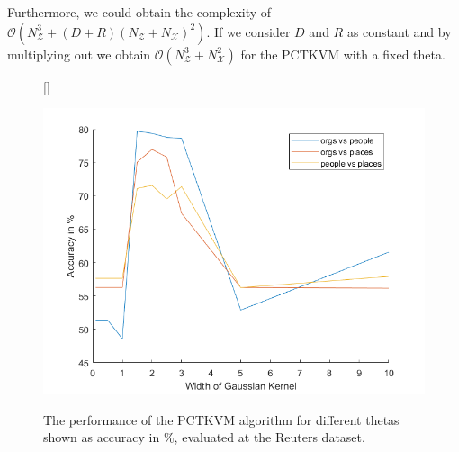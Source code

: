 Furthermore, we could obtain the complexity of $\mathcal{O}(N_\mathcal{Z}^3+(D+R)(N_\mathcal{Z}+N_\mathcal{X})^2)$.
If we consider $D$ and $R$ as constant and by multiplying out we obtain $\mathcal{O}(N_\mathcal{Z}^3+N_\mathcal{X}^2)$ for the \acs{PCTKVM} with a fixed theta.
\begin{figure}
	\centering
	[\FBwidth]
	{\caption[Perfomance in Dependence of Theta]{The performance of the \acs{PCTKVM} algorithm for different thetas shown as accuracy in \%, evaluated at the Reuters dataset.}}
	{\includegraphics[width=\linewidth]{figures/PerformanceGaussianKernel.png}\label{FigPerfomanceTheta}}
\end{figure}
\FloatBarrier
